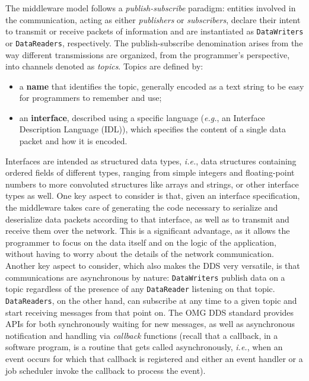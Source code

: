 The middleware model follows a \emph{publish-subscribe} paradigm: entities involved in the communication, acting as either \emph{publishers} or \emph{subscribers}, declare their intent to transmit or receive packets of information and are instantiated as \texttt{DataWriters} or \texttt{DataReaders}, respectively. The publish-subscribe denomination arises from the way different transmissions are organized, from the programmer's perspective, into channels denoted as \emph{topics}. Topics are defined by:
\begin{itemize}
  \item a \textbf{name} that identifies the topic, generally encoded as a text string to be easy for programmers to remember and use;
  \item an \textbf{interface}, described using a specific language (\emph{e.g.}, an Interface Description Language (IDL)), which specifies the content of a single data packet and how it is encoded.
\end{itemize}
Interfaces are intended as structured data types, \emph{i.e.}, data structures containing ordered fields of different types, ranging from simple integers and floating-point numbers to more convoluted structures like arrays and strings, or other interface types as well. One key aspect to consider is that, given an interface specification, the middleware takes care of generating the code necessary to serialize and deserialize data packets according to that interface, as well as to transmit and receive them over the network. This is a significant advantage, as it allows the programmer to focus on the data itself and on the logic of the application, without having to worry about the details of the network communication. Another key aspect to consider, which also makes the DDS very versatile, is that communications are asynchronous by nature: \texttt{DataWriters} publish data on a topic regardless of the presence of any \texttt{DataReader} listening on that topic. \texttt{DataReaders}, on the other hand, can subscribe at any time to a given topic and start receiving messages from that point on. The OMG DDS standard provides APIs for both synchronously waiting for new messages, as well as asynchronous notification and handling via \emph{callback} functions (recall that a callback, in a software program, is a routine that gets called asynchronously, \emph{i.e.}, when an event occurs for which that callback is registered and either an event handler or a job scheduler invoke the callback to process the event).

